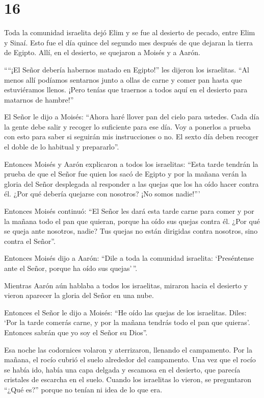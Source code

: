 \hypertarget{section-15}{%
\section{16}\label{section-15}}

 Toda la comunidad israelita dejó Elim y se fue al desierto
de pecado, entre Elim y Sinaí. Esto fue el día quince del segundo mes
después de que dejaran la tierra de Egipto.  Allí, en el
desierto, se quejaron a Moisés y a Aarón.

 ````¡El Señor debería habernos matado en Egipto!'' les
dijeron los israelitas. ``Al menos allí podíamos sentarnos junto a ollas
de carne y comer pan hasta que estuviéramos llenos. ¡Pero tenías que
traernos a todos aquí en el desierto para matarnos de hambre!''

 El Señor le dijo a Moisés: ``Ahora haré llover pan del
cielo para ustedes. Cada día la gente debe salir y recoger lo suficiente
para ese día. Voy a ponerlos a prueba con esto para saber si seguirán
mis instrucciones o no.  El sexto día deben recoger el doble
de lo habitual y prepararlo''.

 Entonces Moisés y Aarón explicaron a todos los israelitas:
``Esta tarde tendrán la prueba de que el Señor fue quien los sacó de
Egipto  y por la mañana verán la gloria del Señor desplegada
al responder a las quejas que los ha oído hacer contra él. ¿Por qué
debería quejarse con nosotros? ¡No somos nadie!'''

 Entonces Moisés continuó: ``El Señor les dará esta tarde
carne para comer y por la mañana todo el pan que quieran, porque ha oído
sus quejas contra él. ¿Por qué se queja ante nosotros, nadie? Tus quejas
no están dirigidas contra nosotros, sino contra el Señor''.

 Entonces Moisés dijo a Aarón: ``Dile a toda la comunidad
israelita: `Preséntense ante el Señor, porque ha oído sus quejas'\,''.

 Mientras Aarón aún hablaba a todos los israelitas, miraron
hacia el desierto y vieron aparecer la gloria del Señor en una nube.

 Entonces el Señor le dijo a Moisés:  ``He
oído las quejas de los israelitas. Diles: `Por la tarde comerás carne, y
por la mañana tendrás todo el pan que quieras'. Entonces sabrán que yo
soy el Señor su Dios''.

 Esa noche las codornices volaron y aterrizaron, llenando
el campamento. Por la mañana, el rocío cubrió el suelo alrededor del
campamento.  Una vez que el rocío se había ido, había una
capa delgada y escamosa en el desierto, que parecía cristales de
escarcha en el suelo.  Cuando los israelitas lo vieron, se
preguntaron ``¿Qué es?'' porque no tenían ni idea de lo que era.

